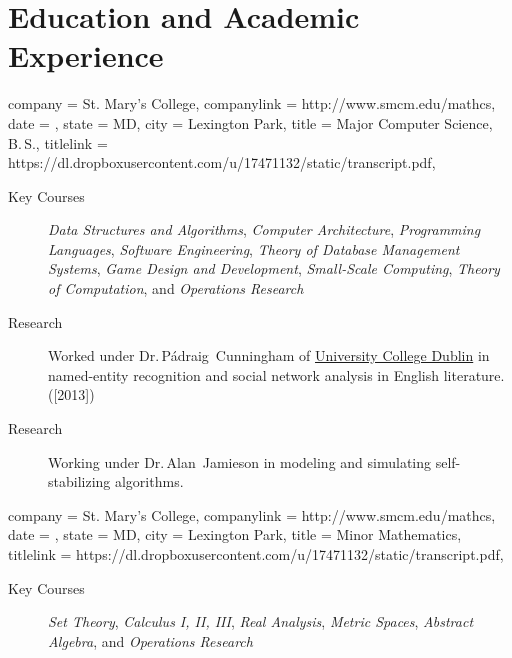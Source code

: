 \documentclass[
textout=\jobname.cv.txt,
textout preamble = preamble.txt,
]{bettercv}
\newcommand \course[1]   {\textit{#1}}
\newcommand \transcript  {https://dl.dropboxusercontent.com/u/17471132/static/transcript.pdf}
\begin{document}
\section{Education and Academic Experience}
\begin{position}
  {
    company = St. Mary's College,
    companylink = http://www.smcm.edu/mathcs,
    date    = ,
    state   = MD,
    city    = Lexington Park,
    title   = {Major \Dash Computer Science, B.\,S.},
    titlelink = \transcript,
  }

\begin{description}
\item[Key Courses]
  \course{Data Structures and Algorithms},
  \course{Computer Architecture},
  \course{Programming Languages},
  \course{Software Engineering},
  \course{Theory of Database Management Systems},
  \course{Game Design and Development},
  \course{Small-Scale Computing},
  \course{Theory of Computation},
  and \course{Operations Research}
\item[Research] Worked under
  Dr.\,P\'adraig~Cunningham of \href{http://www.ucd.ie}{University
    College Dublin} in named-entity recognition and social network
  analysis in English literature. ([2013])
\item[Research] Working under Dr.\,Alan~Jamieson in modeling and
  simulating self-stabilizing algorithms.
\end{description}
\end{position}

\begin{position}
  {
    company = St. Mary's College,
    companylink = http://www.smcm.edu/mathcs,
    date    = ,
    state   = MD,
    city    = Lexington Park,
    title   = Minor \Dash Mathematics,
    titlelink = \transcript,
  }

  \begin{description}
  \item[Key Courses]
    \course{Set Theory},
    \course{Calculus I, II, III},
    \course{Real Analysis},
    \course{Metric Spaces},
    \course{Abstract Algebra},
    and \course{Operations Research}
  \end{description}
\end{position}
\end{document}
